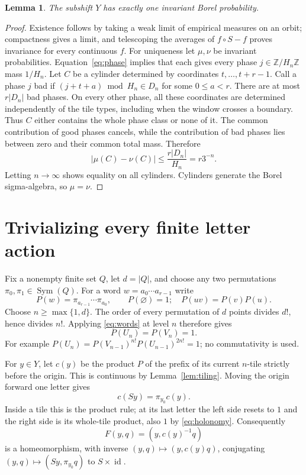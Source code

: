 \documentclass[11pt]{article}
\newtheorem{lemma}[theorem]{Lemma}
\newcommand{\Z}{\mathbb Z}
\newcommand{\Sym}{\operatorname{Sym}}
\newcommand{\id}{\operatorname{id}}
\begin{document}
\begin{lemma}\label{lem:unique}
The subshift $Y$ has exactly one invariant Borel probability.
\end{lemma}
\begin{proof}
Existence follows by taking a weak limit of empirical measures on an orbit; compactness gives a limit, and telescoping the averages of $f\circ S-f$ proves invariance for every continuous $f$.
For uniqueness let $\mu,\nu$ be invariant probabilities. Equation~\eqref{eq:phase} implies that each gives every phase $j\in\Z/H_n\Z$ mass $1/H_n$.
Let $C$ be a cylinder determined by coordinates $t,\ldots,t+r-1$. Call a phase $j$ bad if $(j+t+a)\bmod H_n\in D_n$ for some $0\leq a<r$. There are at most $r|D_n|$ bad phases. On every other phase, all these coordinates are determined independently of the tile types, including when the window crosses a boundary. Thus $C$ either contains the whole phase class or none of it. The common contribution of good phases cancels, while the contribution of bad phases lies between zero and their common total mass. Therefore
\[
 |\mu(C)-\nu(C)|\leq \frac{r|D_n|}{H_n}=r3^{-n}.
\]
Letting $n\to\infty$ shows equality on all cylinders. Cylinders generate the Borel sigma-algebra, so $\mu=\nu$.
\end{proof}

\section{Trivializing every finite letter action}
Fix a nonempty finite set $Q$, let $d=|Q|$, and choose any two permutations $\pi_0,\pi_1\in\Sym(Q)$. For a word $w=a_0\cdots a_{r-1}$ write
\[
 P(w)=\pi_{a_{r-1}}\cdots\pi_{a_0},\qquad P(\varnothing)=1;
 \quad P(uv)=P(v)P(u).
\]
Choose $n\geq\max\{1,d\}$. The order of every permutation of $d$ points divides $d!$, hence divides $n!$. Applying \eqref{eq:words} at level $n$ therefore gives
\begin{equation}\label{eq:holonomy}
 P(U_n)=P(V_n)=1.
\end{equation}
For example $P(U_n)=P(V_{n-1})^{n!}P(U_{n-1})^{2n!}=1$; no commutativity is used.

For $y\in Y$, let $c(y)$ be the product $P$ of the prefix of its current $n$-tile strictly before the origin. This is continuous by Lemma~\ref{lem:tiling}. Moving the origin forward one letter gives
\begin{equation}\label{eq:coboundary}
 c(Sy)=\pi_{y_0}c(y).
\end{equation}
Inside a tile this is the product rule; at its last letter the left side resets to $1$ and the right side is its whole-tile product, also $1$ by \eqref{eq:holonomy}. Consequently
\begin{equation}\label{eq:trivial}
 F(y,q)=(y,c(y)^{-1}q)
\end{equation}
is a homeomorphism, with inverse $(y,q)\mapsto(y,c(y)q)$, conjugating
$(y,q)\mapsto(Sy,\pi_{y_0}q)$ to $S\times\id$.
\end{document}
